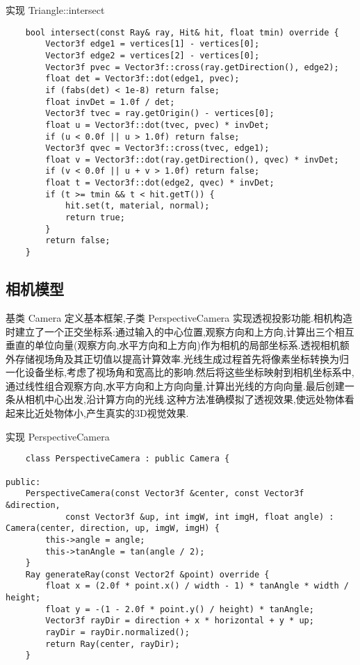 \documentclass[a4paper,twoside]{article}
\begin{document}
\begin{listing}[H]
    \caption{实现 Triangle::intersect}
    \label{code:triangle_intersect}
    \begin{verbatim}
    bool intersect(const Ray& ray, Hit& hit, float tmin) override {
        Vector3f edge1 = vertices[1] - vertices[0];
        Vector3f edge2 = vertices[2] - vertices[0];
        Vector3f pvec = Vector3f::cross(ray.getDirection(), edge2);
        float det = Vector3f::dot(edge1, pvec);
        if (fabs(det) < 1e-8) return false;
        float invDet = 1.0f / det;
        Vector3f tvec = ray.getOrigin() - vertices[0];
        float u = Vector3f::dot(tvec, pvec) * invDet;
        if (u < 0.0f || u > 1.0f) return false;
        Vector3f qvec = Vector3f::cross(tvec, edge1);
        float v = Vector3f::dot(ray.getDirection(), qvec) * invDet;
        if (v < 0.0f || u + v > 1.0f) return false;
        float t = Vector3f::dot(edge2, qvec) * invDet;
        if (t >= tmin && t < hit.getT()) {
            hit.set(t, material, normal);
            return true;
        }
        return false;
    }
    \end{verbatim}
\end{listing}
\subsection{相机模型}
基类 Camera 定义基本框架,子类 PerspectiveCamera 实现透视投影功能.相机构造时建立了一个正交坐标系:通过输入的中心位置,观察方向和上方向,计算出三个相互垂直的单位向量(观察方向,水平方向和上方向)作为相机的局部坐标系.透视相机额外存储视场角及其正切值以提高计算效率.光线生成过程首先将像素坐标转换为归一化设备坐标,考虑了视场角和宽高比的影响.然后将这些坐标映射到相机坐标系中,通过线性组合观察方向,水平方向和上方向向量,计算出光线的方向向量.最后创建一条从相机中心出发,沿计算方向的光线.这种方法准确模拟了透视效果,使远处物体看起来比近处物体小,产生真实的3D视觉效果.
\begin{listing}[H]
    \caption{实现 PerspectiveCamera}
    \label{code:group_intersect}
    \begin{verbatim}
    class PerspectiveCamera : public Camera {

public:
    PerspectiveCamera(const Vector3f &center, const Vector3f &direction,
            const Vector3f &up, int imgW, int imgH, float angle) : Camera(center, direction, up, imgW, imgH) {
        this->angle = angle;
        this->tanAngle = tan(angle / 2);
    }
    Ray generateRay(const Vector2f &point) override {
        float x = (2.0f * point.x() / width - 1) * tanAngle * width / height;
        float y = -(1 - 2.0f * point.y() / height) * tanAngle;
        Vector3f rayDir = direction + x * horizontal + y * up;
        rayDir = rayDir.normalized();
        return Ray(center, rayDir);
    }

    \end{verbatim}
\end{listing}
\end{document}
